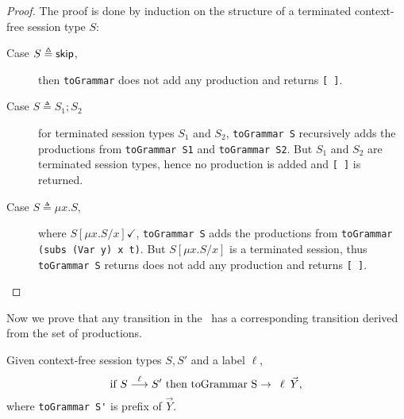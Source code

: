 \begin{proof}
	The proof is done by induction on the structure of a terminated
	context-free session type $S$:
	\begin{description}
		\item[Case $S\triangleq \mathsf{skip}$,] then \lstinline{toGrammar} does not 
		add any production and returns \lstinline{[ ]}.
		\item[Case $S\triangleq S_1;S_2$] for terminated session types $S_1$ 
		and $S_2$, \lstinline{toGrammar S} recursively adds the productions 
		from \lstinline{toGrammar S1} and \lstinline{toGrammar S2}. But $S_1$ 
		and $S_2$ are terminated session types, hence no production is added 
		and \lstinline{[ ]} is returned.
		\item[Case $S\triangleq \mu x. S$,] where $S[\mu x.S/x] \checkmark$,
		\lstinline{toGrammar S} adds the productions from \linebreak
		\lstinline{toGrammar (subs (Var y) x t)}. But $S[\mu x.S/x]$ is a terminated
		session, thus \lstinline{toGrammar S} returns does not add 
		any production and returns \lstinline{[ ]}.
	\end{description}
\end{proof}

Now we prove that any transition in the \LTS\ has a 
corresponding transition derived from the set of productions.

\begin{lemma}
Given context-free session types $S,S'$ and a label $\ell$,
	\[ \text{if } S \LTSderives[\ell] S' \text{ then } 
	\text{\lstinline{toGrammar S}} \rightarrow \enspace 
	\ell \enspace \vec Y, \]
	where \lstinline{toGrammar S'} is prefix of $\vec Y$.
\end{lemma}

